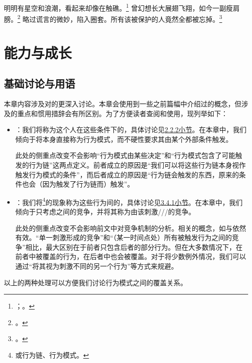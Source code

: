 \begin{savequote}[450pt] %
    \fontsize{8pt}{8pt} %
    明明有星空和浪潮，看起来却像在触礁。\footnote{；。}
    曾幻想长大展翅飞翔，如今一副瘦肩膀。\footnote{。}
    略过谎言的微妙，陷入圈套。所有该被保护的人竟然全都被忘掉。\footnote{。}
\end{savequote}

\chapter{能力与成长\label{chap:成长}}

\addtocounter{section}{-1}
\section{基础讨论与用语}
本章内容涉及对的更深入讨论。本章会使用到一些之前篇幅中介绍过的概念，但涉及的重点和惯用措辞会有所区别。为了方便读者查阅和使用，现列举如下：
\begin{itemize}
\item {}：我们将称为这个人在这些条件下的，具体讨论见\hyperref[sec:行为模式]{2.2.2小节}。在本章中，我们倾向于将本身直接称为行为模式，而不硬性要求其由某个外部条件触发。
\begin{explain}
此处的侧重点改变不会影响“行为模式由某些决定”和“行为模式包含了可能触发的行为链”这两点定义。前者成立的原因是“我们可以将这些行为链本身视作触发行为模式的条件”，而后者成立的原因是“行为链会触发的东西，原来的条件也会（因为触发了行为链而）触发”。
\end{explain}
\item {}：我们将\footnote{或行为链、行为模式。}的现象称为这些行为间的，具体讨论见\hyperref[sec:并行与竞争]{3.4.1小节}。在本章中，我们倾向于只考虑之间的竞争，并将其称为由该刺激///的竞争。
\begin{explain}
此处的侧重点改变不会影响前文中对竞争机制的分析。相关的概念，如与依然有效。“单一刺激形成的竞争”和“（某一时间点处）所有被触发行为之间的竞争”相比，最大区别在于前者只包含后者的部分行为。但在大多数情况下，在前者中被覆盖的行为，在后者中也会被覆盖。对于将少数例外情况，我们可以通过“将其视为刺激不同的另一个行为”等方式来规避。
\end{explain}
\end{itemize}
以上的两种处理可以方便我们讨论行为模式之间的覆盖关系。%

